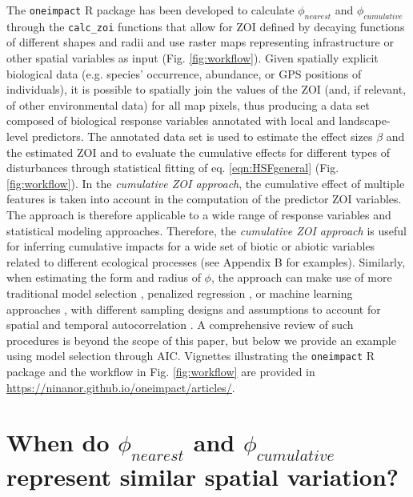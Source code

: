\documentclass[titlepage]{article}
\begin{document}
The \verb|oneimpact| R package has been developed to calculate  $\phi_{nearest}$ and $\phi_{cumulative}$ through the \verb|calc_zoi| functions that allow for ZOI defined by decaying functions of different shapes and radii and use raster maps representing infrastructure or other spatial variables as input (Fig. \ref{fig:workflow}). Given spatially explicit biological data (e.g. species’ occurrence, abundance, or GPS positions of individuals), it is possible to spatially join the values of the ZOI (and, if relevant, of other environmental data) for all map pixels, thus producing a data set composed of biological response variables annotated with local and landscape-level predictors. The annotated data set is used to estimate the effect sizes $\beta$ and the estimated ZOI and to evaluate the cumulative effects for different types of disturbances through statistical fitting of eq. \ref{eqn:HSFgeneral} (Fig. \ref{fig:workflow}). In the \textit{cumulative ZOI approach}, the cumulative effect of multiple features is taken into account in the computation of the predictor ZOI variables. The approach is therefore applicable to a wide range of response variables and statistical modeling approaches. Therefore, the \textit{cumulative ZOI approach} is useful for inferring cumulative impacts for a wide set of biotic or abiotic variables \citep[similar to][]{lowe_scalescape_2022} related to different ecological processes (see Appendix B for examples).
Similarly, when estimating the form and radius of $\phi$, the approach can make use of more traditional model selection \citep{burnham_model_2002,huais_multifit_2018}, penalized regression \citep{lee_estimating_2020}, or machine learning approaches \citep{pichler_machine_2022}, with different sampling designs and assumptions to account for spatial and temporal autocorrelation \citep[see][]{northrup_conceptual_2022}. A comprehensive review of such procedures is beyond the scope of this paper, but below we provide an example using model selection through AIC. Vignettes illustrating the \verb|oneimpact| R package and the workflow in Fig. \ref{fig:workflow} are provided in \url{https://ninanor.github.io/oneimpact/articles/}.

\section{When do $\phi_{nearest}$ and $\phi_{cumulative}$ represent similar spatial variation?}
\end{document}
